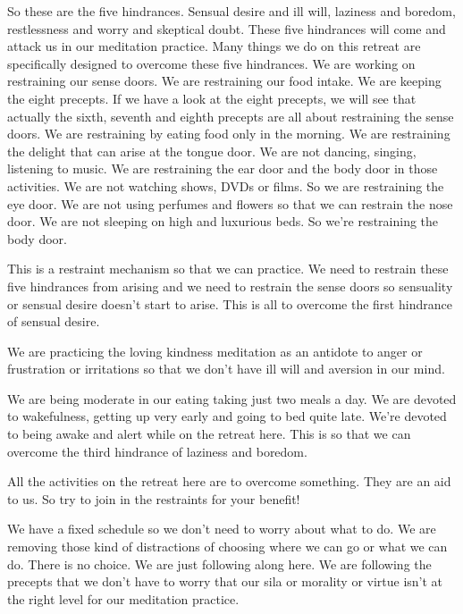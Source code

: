 \documentclass[letterpaper,10pt,english]{sphinxmanual}
\begin{document}
\sphinxAtStartPar
{}  So these are the five hindrances. Sensual desire and ill will, laziness
and  boredom,  restlessness  and  worry  and  skeptical  doubt. These  five  hindrances will come and attack us in our meditation practice. Many things we
do on this retreat are specifically designed to overcome these five hindrances.
We are working on restraining our sense doors. We are restraining our
food intake. We are keeping the eight precepts. If we have a look at the eight
precepts, we will see that actually the sixth, seventh and eighth precepts are
all about restraining the sense doors. We are restraining by eating food only
in the morning. We are restraining the delight that can arise at the tongue
door. We are not dancing, singing, listening to music. We are restraining the
ear door and the body door in those activities. We are not watching shows,
DVDs  or  films.  So  we  are  restraining  the  eye  door. We  are  not  using  perfumes and flowers so that we can restrain the nose door. We are not sleeping
on high and luxurious beds. So we’re restraining the body door.

\sphinxAtStartPar
This  is  a  restraint  mechanism  so  that  we  can  practice.  We  need  to
restrain these five hindrances from arising and we need to restrain the sense
doors so sensuality or sensual desire doesn’t start to arise. This is all to overcome the first hindrance of sensual desire.

\sphinxAtStartPar
We  are  practicing  the  loving  kindness  meditation  as  an  antidote  to
anger or frustration or irritations so that we don’t have ill will and aversion
in our mind.

\sphinxAtStartPar
We are being moderate in our eating taking just two meals a day. We
are devoted to wakefulness, getting up very early and going to bed quite late.
We’re devoted to being awake and alert while on the retreat here. This is so
that we can overcome the third hindrance of laziness and boredom.

\sphinxAtStartPar
All the activities on the retreat here are to overcome something. They
are an aid to us. So try to join in the restraints for your benefit!

\sphinxAtStartPar
We have a fixed schedule so we don’t need to worry about what to do.
We are removing those kind of distractions of choosing where we can go or
what we can do. There is no choice. We are just following along here. We are
following the precepts that we don’t have to worry that our sila or morality
or virtue isn’t at the right level for our meditation practice.
\end{document}
